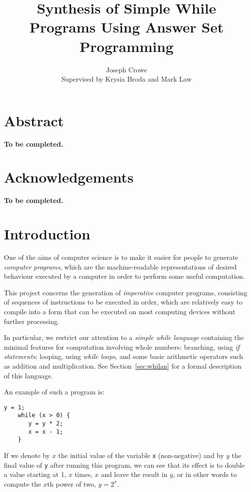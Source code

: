 \documentclass[a4paper,twoside,notitlepage]{article}
\begin{document}
\title{Synthesis of Simple While Programs Using Answer Set Programming}
\author{Joseph Crowe \\ Supervised by Krysia Broda and Mark Law}
\maketitle
\clearpage

\section*{Abstract}
\textbf{To be completed.}

\section*{Acknowledgements}
\textbf{To be completed.}

\clearpage

\tableofcontents

\section{Introduction}

One of the aims of computer science is to make it easier for people to 
generate \emph{computer programs}, which are the machine-readable 
representations of desired behaviour executed by a computer in order to 
perform some useful computation.

This project concerns the generation of \emph{imperative} computer 
programs, consisting of sequences of instructions to be executed in order, 
which are relatively easy to compile into a form that can be executed on 
most computing devices without further processing.

In particular, we restrict our attention to a \emph{simple while language} 
containing the minimal features for computation involving whole numbers: 
branching, using \emph{if statements}; looping, using \emph{while loops}, 
and some basic arithmetic operators such as addition and multiplication. 
See Section~\ref{sec:whilan} for a formal description of this language.

An example of such a program is:
\begin{Verbatim}[samepage=true]
    y = 1;
    while (x > 0) {
       y = y * 2;
       x = x - 1;
    }
\end{Verbatim}
If we denote by $x$ the initial value of the variable \texttt{x} 
(non-negative) and by $y$ the final value of \texttt{y} after running this 
program, we can see that its effect is to double a value starting at 1, 
$x$ times, $x$ and leave the result in $y$, or in other words to compute 
the $x$th power of two, $y = 2^x$.
\end{document}
